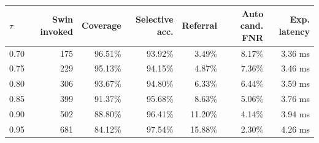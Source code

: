 \begin{tabular}{lrrrrrr}
\toprule
$\tau$ & Swin invoked & Coverage & Selective acc. & Referral & Auto cand. FNR & Exp. latency \\
\midrule
0.70 & 175 & 96.51\% & 93.92\% & 3.49\% & 8.17\% & 3.36 ms \\
0.75 & 229 & 95.13\% & 94.15\% & 4.87\% & 7.36\% & 3.46 ms \\
0.80 & 306 & 93.67\% & 94.80\% & 6.33\% & 6.44\% & 3.59 ms \\
0.85 & 399 & 91.37\% & 95.68\% & 8.63\% & 5.06\% & 3.76 ms \\
0.90 & 502 & 88.80\% & 96.41\% & 11.20\% & 4.14\% & 3.94 ms \\
0.95 & 681 & 84.12\% & 97.54\% & 15.88\% & 2.30\% & 4.26 ms \\
\bottomrule
\end{tabular}
